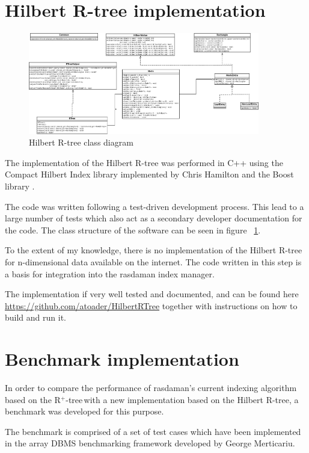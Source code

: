 \documentclass[11pt, a4paper, oneside]{article}
\newcommand{\rplus}{R$^+$-tree$\,$}
\begin{document}
\section{Hilbert R-tree implementation}
\label{sec:hrtree}

\begin{figure}
  \centering
    \includegraphics[width=0.9\textwidth]{img/ClassDiagram.png}
      \caption{Hilbert R-tree class diagram}
  \label{fig:class_diagram}
\end{figure}


The implementation of the Hilbert R-tree was performed in C++ using the Compact Hilbert Index library\cite{libhilbert} implemented by Chris Hamilton and the Boost library \cite{boost}.

The code was written following a test-driven development process. This lead to a large number of tests which also act as a secondary developer documentation for the code.
The class structure of the software can be seen in figure ~\ref{fig:class_diagram}.

To the extent of my knowledge, there is no implementation of the Hilbert R-tree for n-dimensional data available on the internet. The code written in this step is a basis for integration into the rasdaman index manager.

The implementation if very well tested and documented, and can be found here \url{https://github.com/atoader/HilbertRTree} together with instructions on how to build and run it.
\section{Benchmark implementation}
\label{sec:benchmark}
In order to compare the performance of rasdaman's current indexing algorithm based on the \rplus with a new implementation based on the Hilbert R-tree, a benchmark was developed for this purpose.

The benchmark is comprised of a set of test cases which have been implemented in the array DBMS benchmarking framework developed by George Merticariu\cite{GM}.
\end{document}
